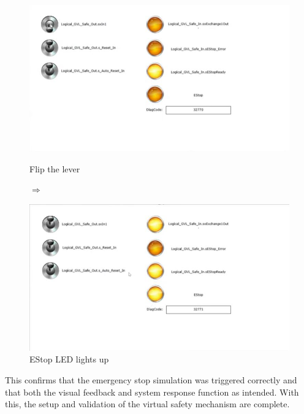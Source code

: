 \documentclass[a4paper,12pt]{article}
\begin{document}
\begin{figure}[H]
	\centering
	\begin{minipage}{0.4\textwidth}
		\centering
		\includegraphics[width=\textwidth]{c6.jpg}
		\caption*{Flip the lever}
	\end{minipage}
	\hspace{0.02\textwidth}
	{\Huge$\Rightarrow$}
	\hspace{0.02\textwidth}
	\begin{minipage}{0.4\textwidth}
		\centering
		\includegraphics[width=\textwidth]{c7.jpg}
		\caption*{EStop LED lights up}
	\end{minipage}
\end{figure}

This confirms that the emergency stop simulation was triggered correctly and that both the visual feedback and system response function as intended. With this, the setup and validation of the virtual safety mechanism are complete.
\end{document}
